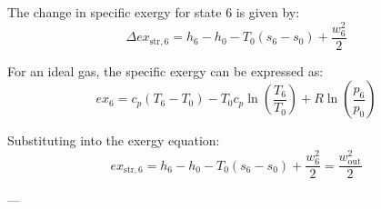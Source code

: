 The change in specific exergy for state 6 is given by:  
\[
\Delta ex_{\text{str},6} = h_6 - h_0 - T_0 (s_6 - s_0) + \frac{w_6^2}{2}
\]  

For an ideal gas, the specific exergy can be expressed as:  
\[
ex_6 = c_p (T_6 - T_0) - T_0 c_p \ln \left( \frac{T_6}{T_0} \right) + R \ln \left( \frac{p_6}{p_0} \right)
\]  

Substituting into the exergy equation:  
\[
ex_{\text{str},6} = h_6 - h_0 - T_0 (s_6 - s_0) + \frac{w_6^2}{2} = \frac{w_{\text{out}}^2}{2}
\]  

---